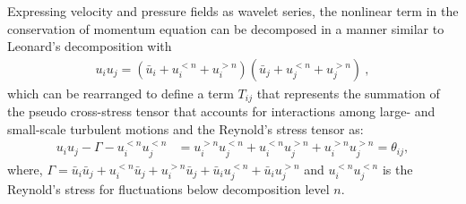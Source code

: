  
Expressing velocity and pressure fields as wavelet series, the nonlinear term in the conservation of momentum equation can be decomposed in a manner similar to Leonard's decomposition \citep{leonard1975} with
\begin{align} 
u_iu_j = (\bar{u}_i+u_i^{<n}+u_i^{>n})(\bar{u}_j+u_j^{<n}+u_j^{>n})\ , 
\end{align}
which can be rearranged to define a term $T_{ij}$ that represents the summation of the pseudo cross-stress tensor  that accounts for interactions among large- and small-scale turbulent motions and the Reynold's stress tensor as:  
\begin{align}
u_iu_j-\Gamma-u_i^{<n}u_j^{<n} & = u_i^{>n}u_j^{<n} + u_i^{<n}u_j^{>n} + u_i^{>n}u_j^{>n}= \theta_{ij} , 
\label{wavelet_pseudo_stress}
\end{align}
where, $\Gamma   = \bar{u}_i\bar{u}_j+u_i^{<n}\bar{u}_j+u_i^{>n}\bar{u}_j+\bar{u}_iu_j^{<n}+\bar{u}_iu_j^{>n}$ and $u_{i}^{<n}u_{j}^{<n}$ is the Reynold's stress for fluctuations below decomposition level $n$.

